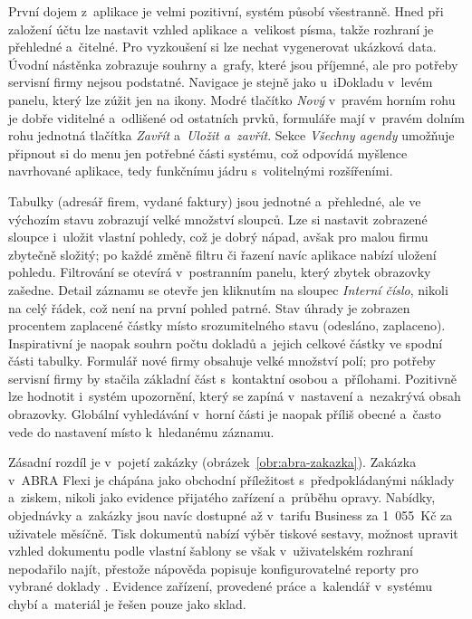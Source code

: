 První dojem z~aplikace je velmi pozitivní, systém působí všestranně. Hned při založení účtu lze nastavit vzhled aplikace a~velikost písma, takže rozhraní je přehledné a~čitelné. Pro vyzkoušení si lze nechat vygenerovat ukázková data. Úvodní nástěnka zobrazuje souhrny a~grafy, které jsou příjemné, ale pro potřeby servisní firmy nejsou podstatné. Navigace je stejně jako u~iDokladu v~levém panelu, který lze zúžit jen na ikony. Modré tlačítko \emph{Nový} v~pravém horním rohu je dobře viditelné a~odlišené od ostatních prvků, formuláře mají v~pravém dolním rohu jednotná tlačítka \emph{Zavřít} a~\emph{Uložit a~zavřít}. Sekce \emph{Všechny agendy} umožňuje připnout si do menu jen potřebné části systému, což odpovídá myšlence navrhované aplikace, tedy funkčnímu jádru s~volitelnými rozšířeními.

Tabulky (adresář firem, vydané faktury) jsou jednotné a~přehledné, ale ve výchozím stavu zobrazují velké množství sloupců. Lze si nastavit zobrazené sloupce i~uložit vlastní pohledy, což je dobrý nápad, avšak pro malou firmu zbytečně složitý; po každé změně filtru či řazení navíc aplikace nabízí uložení pohledu. Filtrování se otevírá v~postranním panelu, který zbytek obrazovky zašedne. Detail záznamu se otevře jen kliknutím na sloupec \emph{Interní číslo}, nikoli na celý řádek, což není na první pohled patrné. Stav úhrady je zobrazen procentem zaplacené částky místo srozumitelného stavu (odesláno, zaplaceno). Inspirativní je naopak souhrn počtu dokladů a~jejich celkové částky ve spodní části tabulky. Formulář nové firmy obsahuje velké množství polí; pro potřeby servisní firmy by stačila základní část s~kontaktní osobou a~přílohami. Pozitivně lze hodnotit i~systém upozornění, který se zapíná v~nastavení a~nezakrývá obsah obrazovky. Globální vyhledávání v~horní části je naopak příliš obecné a~často vede do nastavení místo k~hledanému záznamu.

Zásadní rozdíl je v~pojetí zakázky (obrázek~\ref{obr:abra-zakazka}). Zakázka v~ABRA Flexi je chápána jako obchodní příležitost s~předpokládanými náklady a~ziskem, nikoli jako evidence přijatého zařízení a~průběhu opravy. Nabídky, objednávky a~zakázky jsou navíc dostupné až v~tarifu Business za 1~055~Kč za uživatele měsíčně. Tisk dokumentů nabízí výběr tiskové sestavy, možnost upravit vzhled dokumentu podle vlastní šablony se však v~uživatelském rozhraní nepodařilo najít, přestože nápověda popisuje konfigurovatelné reporty pro vybrané doklady \cite{abra-flexi-reporty}. Evidence zařízení, provedené práce a~kalendář v~systému chybí a~materiál je řešen pouze jako sklad.

